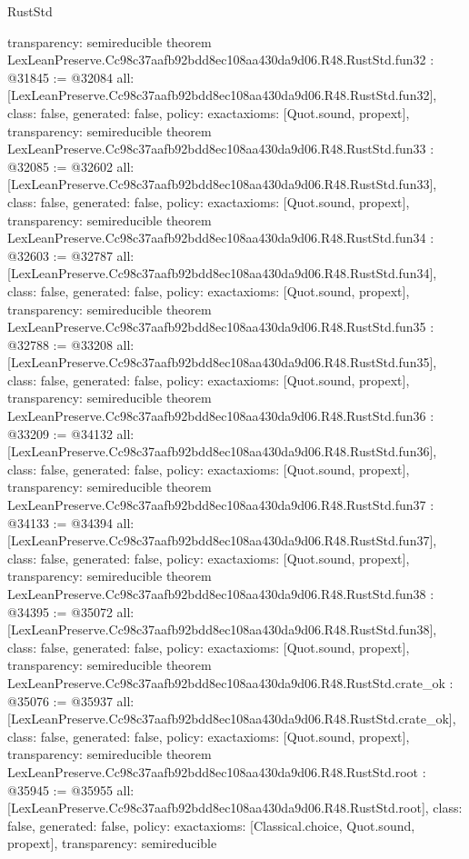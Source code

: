 \begin{lexlean}{RustStd}
\begin{coremodule}
{  transparency: semireducible
}
theorem LexLeanPreserve.Cc98c37aafb92bdd8ec108aa430da9d06.R48.RustStd.fun32 : @31845 := @32084 {
  all: [LexLeanPreserve.Cc98c37aafb92bdd8ec108aa430da9d06.R48.RustStd.fun32],
  class: false,
  generated: false,
  policy: exact{axioms: [Quot.sound, propext]},
  transparency: semireducible
}
theorem LexLeanPreserve.Cc98c37aafb92bdd8ec108aa430da9d06.R48.RustStd.fun33 : @32085 := @32602 {
  all: [LexLeanPreserve.Cc98c37aafb92bdd8ec108aa430da9d06.R48.RustStd.fun33],
  class: false,
  generated: false,
  policy: exact{axioms: [Quot.sound, propext]},
  transparency: semireducible
}
theorem LexLeanPreserve.Cc98c37aafb92bdd8ec108aa430da9d06.R48.RustStd.fun34 : @32603 := @32787 {
  all: [LexLeanPreserve.Cc98c37aafb92bdd8ec108aa430da9d06.R48.RustStd.fun34],
  class: false,
  generated: false,
  policy: exact{axioms: [Quot.sound, propext]},
  transparency: semireducible
}
theorem LexLeanPreserve.Cc98c37aafb92bdd8ec108aa430da9d06.R48.RustStd.fun35 : @32788 := @33208 {
  all: [LexLeanPreserve.Cc98c37aafb92bdd8ec108aa430da9d06.R48.RustStd.fun35],
  class: false,
  generated: false,
  policy: exact{axioms: [Quot.sound, propext]},
  transparency: semireducible
}
theorem LexLeanPreserve.Cc98c37aafb92bdd8ec108aa430da9d06.R48.RustStd.fun36 : @33209 := @34132 {
  all: [LexLeanPreserve.Cc98c37aafb92bdd8ec108aa430da9d06.R48.RustStd.fun36],
  class: false,
  generated: false,
  policy: exact{axioms: [Quot.sound, propext]},
  transparency: semireducible
}
theorem LexLeanPreserve.Cc98c37aafb92bdd8ec108aa430da9d06.R48.RustStd.fun37 : @34133 := @34394 {
  all: [LexLeanPreserve.Cc98c37aafb92bdd8ec108aa430da9d06.R48.RustStd.fun37],
  class: false,
  generated: false,
  policy: exact{axioms: [Quot.sound, propext]},
  transparency: semireducible
}
theorem LexLeanPreserve.Cc98c37aafb92bdd8ec108aa430da9d06.R48.RustStd.fun38 : @34395 := @35072 {
  all: [LexLeanPreserve.Cc98c37aafb92bdd8ec108aa430da9d06.R48.RustStd.fun38],
  class: false,
  generated: false,
  policy: exact{axioms: [Quot.sound, propext]},
  transparency: semireducible
}
theorem LexLeanPreserve.Cc98c37aafb92bdd8ec108aa430da9d06.R48.RustStd.crate_ok : @35076 := @35937 {
  all: [LexLeanPreserve.Cc98c37aafb92bdd8ec108aa430da9d06.R48.RustStd.crate_ok],
  class: false,
  generated: false,
  policy: exact{axioms: [Quot.sound, propext]},
  transparency: semireducible
}
theorem LexLeanPreserve.Cc98c37aafb92bdd8ec108aa430da9d06.R48.RustStd.root : @35945 := @35955 {
  all: [LexLeanPreserve.Cc98c37aafb92bdd8ec108aa430da9d06.R48.RustStd.root],
  class: false,
  generated: false,
  policy: exact{axioms: [Classical.choice, Quot.sound, propext]},
  transparency: semireducible
}


\end{coremodule}
\end{lexlean}
